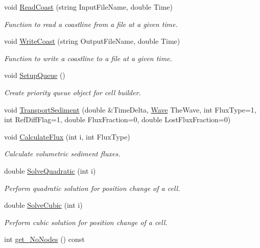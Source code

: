 \begin{DoxyCompactItemize}
void \hyperlink{classCoastline_ad901fe37293a0c16c37642d8f8d6e481}{Read\-Coast} (string Input\-File\-Name, double Time)
\begin{DoxyCompactList}\small\item\em Function to read a coastline from a file at a given time. \end{DoxyCompactList}\item 
void \hyperlink{classCoastline_a032c2f5c5c956daca79c5df94e56caf7}{Write\-Coast} (string Output\-File\-Name, double Time)
\begin{DoxyCompactList}\small\item\em Function to write a coastline to a file at a given time. \end{DoxyCompactList}\item 
void \hyperlink{classCoastline_a0642cbf3fc04602bf1d2d20531e9041d}{Setup\-Queue} ()
\begin{DoxyCompactList}\small\item\em Create priority queue object for cell builder. \end{DoxyCompactList}\item 
void \hyperlink{classCoastline_ae2f97f82c5094636ac2bf6170f8a9613}{Transport\-Sediment} (double \&Time\-Delta, \hyperlink{classWave}{Wave} The\-Wave, int Flux\-Type=1, int Ref\-Diff\-Flag=1, double Flux\-Fraction=0, double Lost\-Flux\-Fraction=0)
\item 
void \hyperlink{classCoastline_aa454dcdb2dd54d65329831bd747ed22d}{Calculate\-Flux} (int i, int Flux\-Type)
\begin{DoxyCompactList}\small\item\em Calculate volumetric sediment fluxes. \end{DoxyCompactList}\item 
double \hyperlink{classCoastline_ab9e46b4dedb2dcce9f28112ba732088c}{Solve\-Quadratic} (int i)
\begin{DoxyCompactList}\small\item\em Perform quadratic solution for position change of a cell. \end{DoxyCompactList}\item 
double \hyperlink{classCoastline_ad61c1c09050f4351a8fafca421f0979b}{Solve\-Cubic} (int i)
\begin{DoxyCompactList}\small\item\em Perform cubic solution for position change of a cell. \end{DoxyCompactList}\item 
int \hyperlink{classCoastline_abe2c7858ba09dad8cde3ecf6b0ee76b3}{get\-\_\-\-No\-Nodes} () const 

\end{DoxyCompactItemize}
